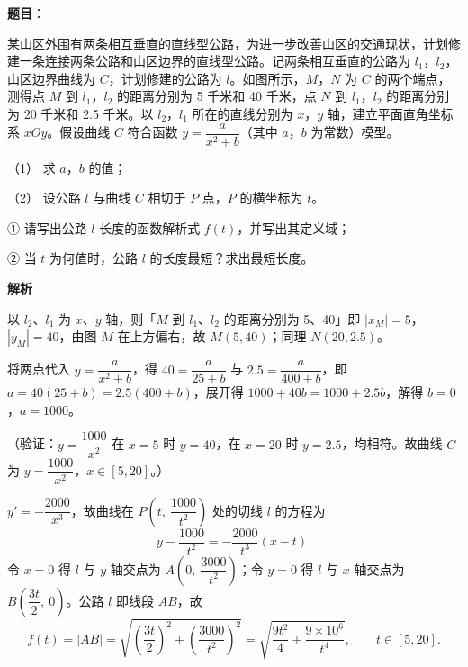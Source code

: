 \begin{answer}

\textbf{题目}：

某山区外围有两条相互垂直的直线型公路，为进一步改善山区的交通现状，计划修建一条连接两条公路和山区边界的直线型公路。记两条相互垂直的公路为 \(l_{1}\)，\(l_{2}\)，山区边界曲线为 \(C\)，计划修建的公路为 \(l\)。如图所示，\(M\)，\(N\) 为 \(C\) 的两个端点，测得点 \(M\) 到 \(l_{1}\)，\(l_{2}\) 的距离分别为 5 千米和 40 千米，点 \(N\) 到 \(l_{1}\)，\(l_{2}\) 的距离分别为 20 千米和 2.5 千米。以 \(l_{2}\)，\(l_{1}\) 所在的直线分别为 \(x\)，\(y\) 轴，建立平面直角坐标系 \(xOy\)。假设曲线 \(C\) 符合函数 \(y=\dfrac{a}{x^{2}+b}\)（其中 \(a\)，\(b\) 为常数）模型。

（1） 求 \(a\)，\(b\) 的值；

（2） 设公路 \(l\) 与曲线 \(C\) 相切于 \(P\) 点，\(P\) 的横坐标为 \(t\)。

① 请写出公路 \(l\) 长度的函数解析式 \(f(t)\)，并写出其定义域；

② 当 \(t\) 为何值时，公路 \(l\) 的长度最短？求出最短长度。
\nopagebreak[4]
\begin{center}\end{center}
\nopagebreak[4]
\textbf{解析}


以 \(l_{2}\)、\(l_{1}\) 为 \(x\)、\(y\) 轴，则「\(M\) 到 \(l_{1}\)、\(l_{2}\) 的距离分别为 5、40」即 \(|x_{M}|=5\)，\(|y_{M}|=40\)，由图 \(M\) 在上方偏右，故 \(M(5,40)\)；同理 \(N(20,2.5)\)。

将两点代入 \(y=\dfrac{a}{x^{2}+b}\)，得 \(40=\dfrac{a}{25+b}\) 与 \(2.5=\dfrac{a}{400+b}\)，即 \(a=40(25+b)=2.5(400+b)\)，展开得 \(1000+40b=1000+2.5b\)，解得 \(b=0\)，\(a=1000\)。

（验证：\(y=\dfrac{1000}{x^{2}}\) 在 \(x=5\) 时 \(y=40\)，在 \(x=20\) 时 \(y=2.5\)，均相符。故曲线 \(C\) 为 \(y=\dfrac{1000}{x^{2}}\)，\(x\in[5,20]\)。）



\(y'=-\dfrac{2000}{x^{3}}\)，故曲线在 \(P\left(t,\ \dfrac{1000}{t^{2}}\right)\) 处的切线 \(l\) 的方程为
\nopagebreak[4]
\[
y-\frac{1000}{t^{2}}=-\frac{2000}{t^{3}}(x-t).
\]
令 \(x=0\) 得 \(l\) 与 \(y\) 轴交点为 \(A\left(0,\ \dfrac{3000}{t^{2}}\right)\)；令 \(y=0\) 得 \(l\) 与 \(x\) 轴交点为 \(B\left(\dfrac{3t}{2},\ 0\right)\)。公路 \(l\) 即线段 \(AB\)，故
\nopagebreak[4]
\[
f(t)=|AB|=\sqrt{\left(\frac{3t}{2}\right)^{2}+\left(\frac{3000}{t^{2}}\right)^{2}}=\sqrt{\frac{9t^{2}}{4}+\frac{9\times10^{6}}{t^{4}}},\qquad t\in[5,20].
\]


\end{answer}
